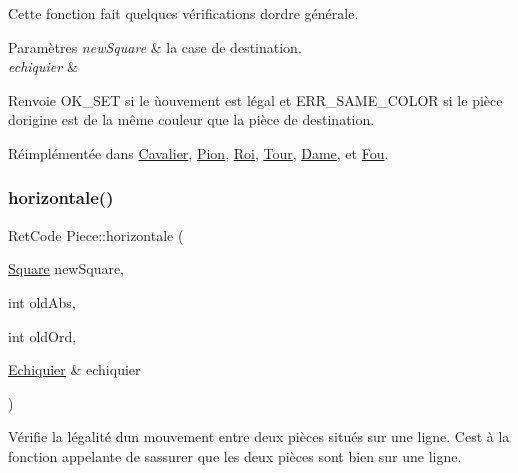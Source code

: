 Cette fonction fait quelques vérifications d\textquotesingle{}ordre générale. 


\begin{DoxyParams}{Paramètres}
{\em new\+Square} & la case de destination. \\
\hline
{\em echiquier} & \\
\hline
\end{DoxyParams}
\begin{DoxyReturn}{Renvoie}
O\+K\+\_\+\+S\+ET si le ùouvement est légal et E\+R\+R\+\_\+\+S\+A\+M\+E\+\_\+\+C\+O\+L\+OR si le pièce d\textquotesingle{}origine est de la même couleur que la pièce de destination. 
\end{DoxyReturn}


Réimplémentée dans \hyperlink{classCavalier_a6ed7d1f1410e9b03842ce56bb7a41c12}{Cavalier}, \hyperlink{classPion_aa7c1043d5491beec7aa809902a08c6b6}{Pion}, \hyperlink{classRoi_abba3adc6d75ad23c0a1293ffcd4741ee}{Roi}, \hyperlink{classTour_a13fb6cfb9c1ebc615b2e0b373d1d37c0}{Tour}, \hyperlink{classDame_a035c96c1763d0d111a4b4cde9678e75f}{Dame}, et \hyperlink{classFou_a5b1e65e01d3172846e0e28e8ac50c03d}{Fou}.

\mbox{\label{classPiece_a5f13c0a4cc2694f4e14117d9b48a9ca4}} 
\subsubsection{\texorpdfstring{horizontale()}{horizontale()}}
{\footnotesize\ttfamily Ret\+Code Piece\+::horizontale (\begin{DoxyParamCaption}\item[{\hyperlink{classSquare}{Square}}]{new\+Square,  }\item[{int}]{old\+Abs,  }\item[{int}]{old\+Ord,  }\item[{\hyperlink{classEchiquier}{Echiquier} \&}]{echiquier }\end{DoxyParamCaption})}



Vérifie la légalité d\textquotesingle{}un mouvement entre deux pièces situés sur une ligne. C\textquotesingle{}est à la fonction appelante de s\textquotesingle{}assurer que les deux pièces sont bien sur une ligne. 


